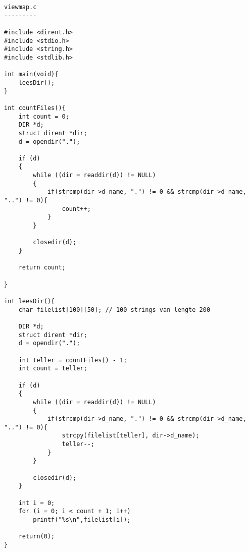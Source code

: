 \begin{lstlisting}
viewmap.c
---------

#include <dirent.h>
#include <stdio.h>
#include <string.h>
#include <stdlib.h>

int main(void){
	leesDir();
}

int countFiles(){
	int count = 0;
	DIR *d;
	struct dirent *dir;
	d = opendir(".");

	if (d)
	{
		while ((dir = readdir(d)) != NULL)
		{
			if(strcmp(dir->d_name, ".") != 0 && strcmp(dir->d_name, "..") != 0){
				count++;
			}
		}

		closedir(d);
	}

	return count;

}

int leesDir(){
	char filelist[100][50]; // 100 strings van lengte 200

	DIR *d;
	struct dirent *dir;
	d = opendir(".");

	int teller = countFiles() - 1;
	int count = teller;

	if (d)
	{
		while ((dir = readdir(d)) != NULL)
		{
			if(strcmp(dir->d_name, ".") != 0 && strcmp(dir->d_name, "..") != 0){
				strcpy(filelist[teller], dir->d_name);
				teller--;
			}
		}

		closedir(d);
	}

	int i = 0;
	for (i = 0; i < count + 1; i++)
		printf("%s\n",filelist[i]);

	return(0);
}
\end{lstlisting}